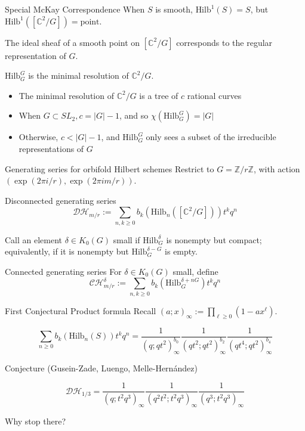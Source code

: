 \documentclass{beamer}
\newcommand{\Hilb}{\textrm{Hilb}}
\newcommand{\C}{\mathbb{C}}
\newcommand{\Z}{\mathbb{Z}}
\begin{document}
\begin{frame}{Special McKay Correspondence}
When $S$ is smooth, $\Hilb^1(S)=S$,  but $\Hilb^1([\C^2/G])=\textrm{point}$.

The ideal sheaf of a smooth point on $[\C^2/G]$ corresponds to the regular representation of $G$.

\begin{theorem}
$\Hilb_G^G$ is the minimal resolution of $\C^2/G$.
\end{theorem}

\begin{itemize}
\item The minimal resolution of $\C^2/G$ is a tree of $c$ rational curves
\item When $G\subset SL_2, c=|G|-1$, and so $\chi(\Hilb_G^G)=|G|$
\item Otherwise, $c<|G|-1$, and $\Hilb_G^G$ only sees a subset of the irreducible representations of $G$
\end{itemize}

\end{frame}





\begin{frame}{Generating series for orbifold Hilbert schemes}
Restrict to $G=\Z/r\Z$, with action $(\exp(2\pi i /r),\exp(2\pi i m/r))$.
\begin{block}{Disconnected generating series}
$$\mathcal{DH}_{m/r}:=\sum_{n,k\geq 0 } b_k(\Hilb_n([\C^2/G])) t^kq^n$$
\end{block}
Call an element $\delta\in K_0(G)$ small if $\Hilb^\delta_G$ is nonempty but compact; equivalently, if it is nonempty but $\Hilb^{\delta-G}_G$ is empty.

\begin{block}{Connected generating series}
For $\delta\in K_0(G)$ small, define 
$$\mathcal{CH}^\delta_{m/r}:=\sum_{n,k\geq 0} b_k(\Hilb^{\delta+nG}_G)t^kq^n$$
\end{block}
\end{frame}





\begin{frame}{First Conjectural Product formula}
Recall $(a;x)_\infty:=\prod_{\ell\geq 0} (1-ax^\ell)$.
\begin{example}[G\"ottsche]
$$\sum_{n\geq 0} b_k(\Hilb_n(S))t^kq^n=
\frac{1}{(q;qt^2)_\infty^{b_0}}\frac{1}{(qt^2;qt^2)_\infty^{b_2}}\frac{1}{(qt^4;qt^2)_\infty^{b_4}}$$
\end{example}
\begin{block}{Conjecture (Gusein-Zade, Luengo, Melle-Hern\'andez)}

$$\mathcal{DH}_{1/3}=\frac{1}{(q;t^2q^3)_\infty}\frac{1}{(q^2t^2;t^2q^3)_\infty}\frac{1}{(q^3;t^2q^3)_\infty}$$
\end{block}
\begin{block}{Why stop there?} 
\end{block}
\end{frame}
\end{document}
